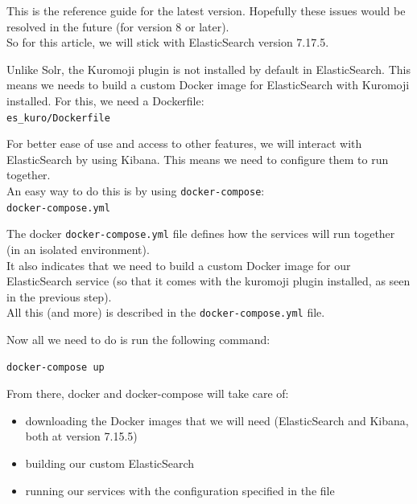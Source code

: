 \bigskip
This is the reference guide for the latest version. Hopefully these issues would be resolved in the future (for version 8 or later). \\

So for this article, we will stick with ElasticSearch version 7.17.5. \\


\bigskip
\bigskip

Unlike Solr, the Kuromoji plugin is not installed by default in ElasticSearch. This means we needs to build a custom Docker image for ElasticSearch with Kuromoji installed. For this, we need a Dockerfile: \\

\texttt{es\_kuro/Dockerfile}



\bigskip

For better ease of use and access to other features, we will interact with ElasticSearch by using Kibana. This means we need to configure them to run together. \\

An easy way to do this is by using \texttt{docker-compose}: \\

\texttt{docker-compose.yml}


\bigskip

The docker \texttt{docker-compose.yml} file defines how the services will run together (in an isolated environment). \\

It also indicates that we need to build a custom Docker image for our ElasticSearch service (so that it comes with the kuromoji plugin installed, as seen in the previous step). \\

All this (and more) is described in the \texttt{docker-compose.yml} file. \\

\bigskip

Now all we need to do is run the following command:

\begin{lstlisting}[language=sh]
docker-compose up
\end{lstlisting}

\bigskip

From there, docker and docker-compose will take care of:
\begin{itemize}
	\item downloading the Docker images that we will need (ElasticSearch and Kibana, both at version 7.15.5)
	
	\item building our custom ElasticSearch
	
	\item running our services with the configuration specified in the file
\end{itemize}

